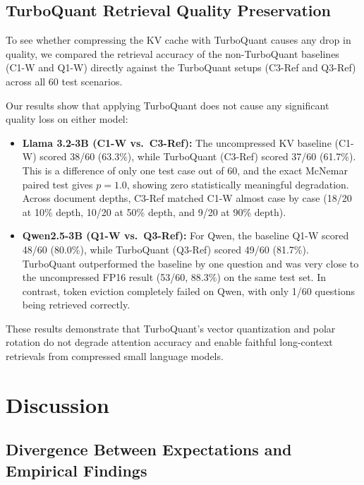 \documentclass[sigconf,nonacm]{acmart}
\begin{document}
\subsection{TurboQuant Retrieval Quality Preservation}

To see whether compressing the KV cache with TurboQuant causes any drop in quality, we compared the retrieval accuracy of the non-TurboQuant baselines (C1-W and Q1-W) directly against the TurboQuant setups (C3-Ref and Q3-Ref) across all 60 test scenarios.

Our results show that applying TurboQuant does not cause any significant quality loss on either model:
\begin{itemize}
  \item \textbf{Llama 3.2-3B (C1-W vs.\ C3-Ref):} The uncompressed KV baseline (C1-W) scored 38/60 (63.3\%), while TurboQuant (C3-Ref) scored 37/60 (61.7\%). This is a difference of only one test case out of 60, and the exact McNemar paired test gives $p = 1.0$, showing zero statistically meaningful degradation. Across document depths, C3-Ref matched C1-W almost case by case (18/20 at 10\% depth, 10/20 at 50\% depth, and 9/20 at 90\% depth).
  \item \textbf{Qwen2.5-3B (Q1-W vs.\ Q3-Ref):} For Qwen, the baseline Q1-W scored 48/60 (80.0\%), while TurboQuant (Q3-Ref) scored 49/60 (81.7\%). TurboQuant outperformed the baseline by one question and was very close to the uncompressed FP16 result (53/60, 88.3\%) on the same test set. In contrast, token eviction completely failed on Qwen, with only 1/60 questions being retrieved correctly.


\end{itemize}

These results demonstrate that TurboQuant's vector quantization and polar rotation do not degrade attention accuracy and enable faithful long-context retrievals from compressed small language models.


\section{Discussion}

\subsection{Divergence Between Expectations and Empirical Findings}
\end{document}
